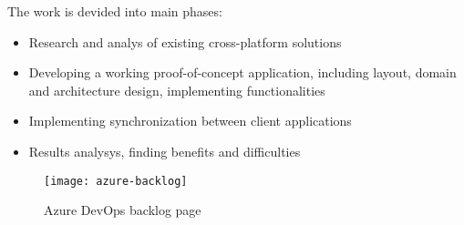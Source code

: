 The work is devided into main phases:

\begin{itemize}
    \item Research and analys of existing cross-platform solutions
    \item Developing a working proof-of-concept application, including layout, domain and architecture design, implementing functionalities
    \item Implementing synchronization between client applications
    \item Results analysys, finding benefits and difficulties
\end{itemize}

\begin{figure}[H]
    \centering
    \texttt{[image: azure-backlog]}
    \caption[Azure DevOps backlog page]{\label{fig:azuredevops} Azure DevOps backlog page }
\end{figure}